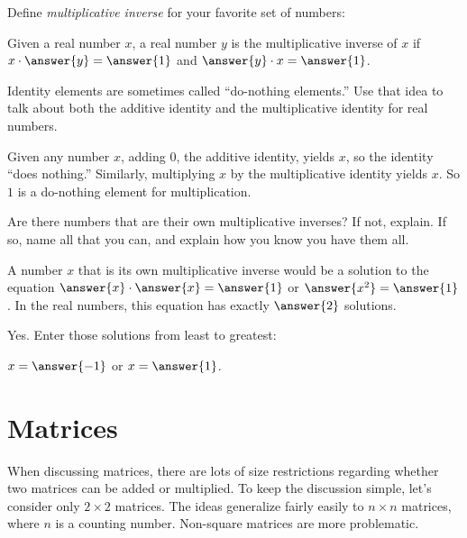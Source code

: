 \documentclass[space,nooutcomes]{ximera}
\begin{document}
\begin{question}Define \emph{multiplicative inverse} for your favorite set of numbers:   

Given a real number $x$, a real number $y$ is the multiplicative inverse of $x$ if $x\cdot\answer{y}=\answer{1}$ 
and $\answer{y}\cdot x=\answer{1}$.  

\end{question}

\begin{question}Identity elements are sometimes called ``do-nothing elements.''  Use that idea to talk about both the additive identity and the multiplicative identity for real numbers.  
\begin{freeResponse}
\begin{hint}
Given any number $x$, adding $0$, the additive identity, yields $x$, so the identity ``does nothing.''  Similarly, multiplying $x$ by the multiplicative identity yields $x$.  So $1$ is a do-nothing element for multiplication.  
\end{hint}
\end{freeResponse}
\end{question}

\begin{question}
Are there numbers that are their own multiplicative inverses?  If not, explain.  If so, name all that you can, and explain how you know you have them all.
\begin{solution}
A number $x$ that is its own multiplicative inverse would be a solution to the equation $\answer{x}\cdot \answer{x}=\answer{1}$ or $\answer{x^2}=\answer{1}$.  In the real numbers, this equation has exactly $\answer{2}$ solutions.   
\begin{question}
Yes.  Enter those solutions from least to greatest: 

$x = \answer{-1}$ or $x = \answer{1}$.
\end{question}
\end{solution}
\end{question}

\section*{Matrices}
When discussing matrices, there are lots of size restrictions
regarding whether two matrices can be added or multiplied.  To keep
the discussion simple, let's consider only $2\times 2$ matrices.  The
ideas generalize fairly easily to $n\times n$ matrices, where $n$ is a
counting number.  Non-square matrices are more problematic.
\end{document}
